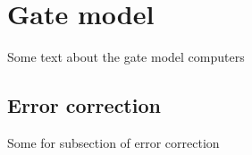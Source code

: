 \section{Gate model}
Some text about the gate model computers

\subsection{Error correction}
Some for subsection of error correction